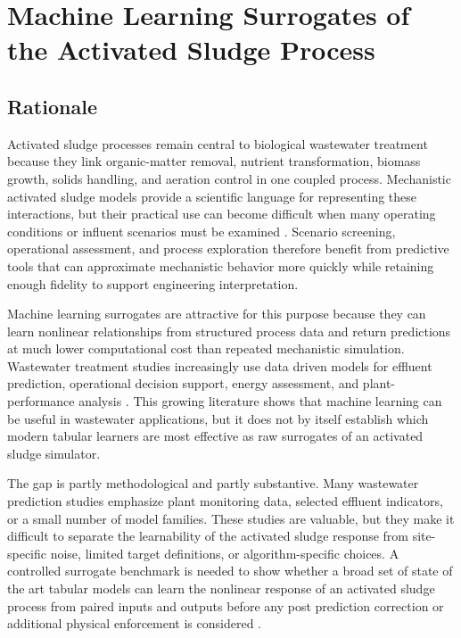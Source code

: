 \documentclass[12pt, twoside]{book}
\begin{document}
\chapter{Machine Learning Surrogates of the Activated Sludge Process}
\label{ch:surrogates}

\section{Rationale}

Activated sludge processes remain central to biological wastewater treatment because they link organic-matter
removal, nutrient transformation, biomass growth, solids handling, and aeration control in one coupled process.
Mechanistic activated sludge models provide a scientific language for representing these interactions, but
their practical use can become difficult when many operating conditions or influent scenarios must be examined
\citep{Henze1999,Henze2006,Guerrero2011}. Scenario screening, operational assessment, and process exploration
therefore benefit from predictive tools that can approximate mechanistic behavior more quickly while retaining
enough fidelity to support engineering interpretation.

Machine learning surrogates are attractive for this purpose because they can learn nonlinear relationships
from structured process data and return predictions at much lower computational cost than repeated mechanistic
simulation. Wastewater treatment studies increasingly use data driven models for effluent prediction,
operational decision support, energy assessment, and plant-performance analysis
\citep{Newhart2019,Asadi2017,Mao2024,Sadeghassadi2018,Croll2023,Wang2025,Yang2025}. This growing literature
shows that machine learning can be useful in wastewater applications, but it does not by itself establish
which modern tabular learners are most effective as raw surrogates of an activated sludge simulator.

The gap is partly methodological and partly substantive. Many wastewater prediction studies emphasize plant
monitoring data, selected effluent indicators, or a small number of model families. These studies are valuable,
but they make it difficult to separate the learnability of the activated sludge response from site-specific
noise, limited target definitions, or algorithm-specific choices. A controlled surrogate benchmark is needed
to show whether a broad set of state of the art tabular models can learn the nonlinear response of an
activated sludge process from paired inputs and outputs before any post prediction correction or additional
physical enforcement is considered \citep{Borisov2024,ShwartzZiv2022}.
\end{document}
